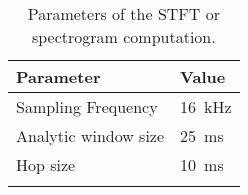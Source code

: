 
\begin{table}[ht!]
\begin{center}
\caption{Parameters of the STFT or spectrogram computation.}
\begin{tabular}{ M{4cm}  M{4cm}}
\toprule
\textbf{Parameter} & \textbf{Value} \\
\midrule
Sampling Frequency & \SI{16}{\kilo\hertz}\\
Analytic window size & \SI{25}{\milli\second}\\
Hop size & \SI{10}{\milli\second}\\
\bottomrule
\label{tab:signal_spec_stft}
\end{tabular}
\end{center}
\end{table}
\FloatBarrier
\noindent

